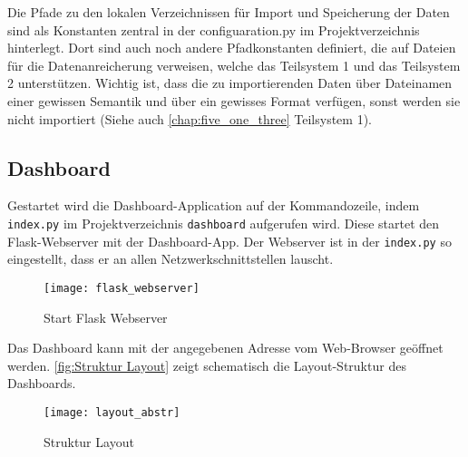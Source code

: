     Die Pfade zu den lokalen Verzeichnissen für Import und Speicherung der Daten sind als Konstanten zentral in der configuaration.py 
    im Projektverzeichnis hinterlegt. Dort sind auch noch andere Pfadkonstanten definiert, die auf Dateien für die Datenanreicherung verweisen, welche das Teilsystem 1
    und das Teilsystem 2 unterstützen. Wichtig ist, dass die zu importierenden Daten über Dateinamen einer gewissen Semantik und 
    über ein gewisses Format verfügen, sonst werden sie nicht importiert (Siehe auch \autoref{chap:five_one_three} Teilsystem 1).

    \subsection{Dashboard}
    Gestartet wird die Dashboard-Application auf der Kommandozeile, indem \texttt{index.py} im Projektverzeichnis \texttt{dashboard}
    aufgerufen wird. Diese startet den Flask-Webserver mit der Dashboard-App. Der Webserver ist in der \texttt{index.py} so eingestellt, 
    dass er an allen Netzwerkschnittstellen lauscht.


    \begin{figure}[H]
        \centering
            \texttt{[image: flask\_webserver]}
            \caption{Start Flask Webserver}
            \label{fig:flask}
    \end{figure}

    
    Das Dashboard kann mit der angegebenen Adresse vom Web-Browser geöffnet werden.
    \autoref{fig:Struktur Layout} zeigt schematisch die Layout-Struktur des Dashboards. 


    \begin{figure}[H]
        \centering
            \texttt{[image: layout\_abstr]}
            \caption{Struktur Layout}
            \label{fig:Struktur Layout}
    \end{figure}


